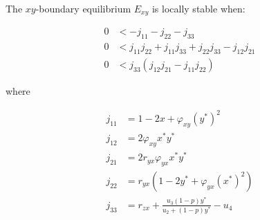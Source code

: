\begin{theorem}\label{thm:eq-boundary-xy-stability}
    The $xy$-boundary equilibrium $E_{xy}$ is locally stable when:

    \begin{align*}
        0 &< -j_{11}-j_{22}-j_{33}\\
        0 &< j_{11}j_{22}+j_{11}j_{33}+j_{22}j_{33}-j_{12}j_{21}\\
        0 &< j_{33}\left(j_{12}j_{21}-j_{11}j_{22}\right)
    \end{align*}

    where
    
    \begin{align*}
        j_{11} &= 1-2x+\varphi_{xy}\left(y^*\right)^2\\
        j_{12} &= 2\varphi_{xy}x^*y^*\\
        j_{21} &= 2r_{yx}\varphi_{yx}x^*y^*\\
        j_{22} &= r_{yx}\left(1-2y^*+\varphi_{yx}\left(x^*\right)^2\right)\\
        j_{33} &= r_{zx}+\frac{u_3\left(1-p\right)y^*}{u_2+\left(1-p\right)y^*}-u_4
    \end{align*}
\end{theorem}
